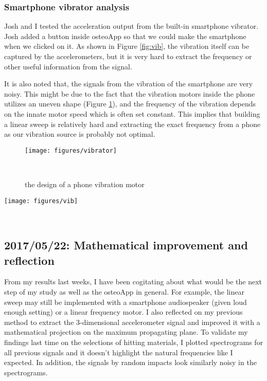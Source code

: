 \documentclass{sigchi}
\begin{document}
\subsubsection{Smartphone vibrator analysis} 

Josh and I tested the acceleration output from the built-in smartphone vibrator. Josh added a button inside osteoApp so that we could make the smartphone when we clicked on it. As shown in Figure \ref{fig:vib}, the vibration itself can be captured by the accelerometers, but it is very hard to extract the frequency or other useful information from the signal.

It is also noted that, the signals from the vibration of the smartphone are very noisy. This might be due to the fact that the vibration motors inside the phone utilizes an uneven shape (Figure \ref{fig:vibrator}), and the frequency of the vibration depends on the innate motor speed which is often set constant. This implies that building a linear sweep is relatively hard and extracting the exact frequency from a phone as our vibration source is probably not optimal.

\begin{figure}
\centering
  \texttt{[image: figures/vibrator]}
  \caption{the design of a phone vibration motor}~\label{fig:vibrator}
\end{figure}

\begin{figure*}
  \centering
  \texttt{[image: figures/vib]}
  \caption{accelerometer signals vs. time in smartphone vibrator analysis in take 1~4.}
    ~\label{fig:vib}
\end{figure*}


\subsection{2017/05/22: Mathematical improvement and reflection}

From my results last weeks, I have been cogitating about what would be the next step of my study as well as the osteoApp in general. For example, the linear sweep may still be implemented with a smartphone audiospeaker (given loud enough setting) or a linear frequency motor. I also reflected on my previous method to extract the 3-dimensional accelerometer signal and improved it with a mathematical projection on the maximum propagating plane. To validate my findings last time on the selections of hitting materials, I plotted spectrograms for all previous signals and it doesn't highlight the natural frequencies like I expected. In addition, the signals by random impacts look similarly noisy in the spectrograms.
\end{document}
